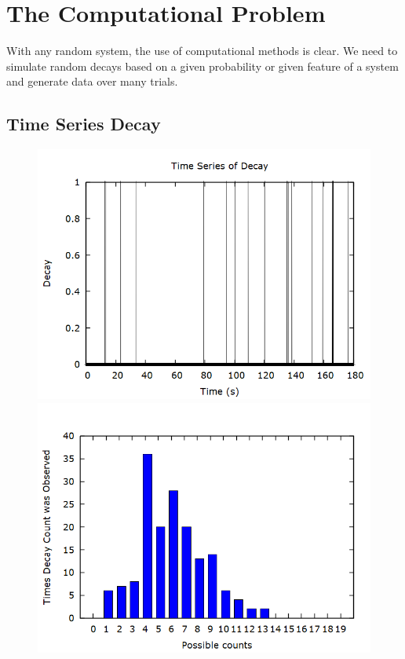 \documentclass[aps,prl,twocolumn,superscriptaddress]{revtex4-1}
\begin{document}
\section{The Computational Problem} 
With any random system, the use of computational methods is clear. We need to simulate random decays based on a given probability or given feature of a system and generate data over many trials. 

\subsection{Time Series Decay}

\begin{figure}[htbp]
  	\begin{center}
 		\includegraphics[scale=0.25]{tsd.png}
 		\includegraphics[scale=0.32]{tsdhisto.png}

\end{center}
\end{figure}
\end{document}
